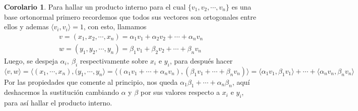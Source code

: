 \documentclass[10pt]{article}
\theoremstyle{definition}
\newtheorem{corollary}{Corolario}[theorem]
\begin{document}
\begin{corollary}
    Para hallar un producto interno para el cual $\{v_1,v_2,\cdots,v_n\}$ es una base ortonormal primero recordemos que todos sus vectores son ortogonales entre ellos y ademas $\langle v_i,v_i\rangle=1$, con esto, llamamos
    $$\begin{matrix}
v=( x_{1} ,x_{2} ,\cdots ,x_{n}) =\alpha _{1} v_{1} +\alpha _{2} v_{2} +\cdots +\alpha _{n} v_{n}\\
w=( y_{1} ,y_{2} ,\cdots ,y_{n}) =\beta _{1} v_{1} +\beta _{2} v_{2} +\cdots +\beta _{n} v_{n}
\end{matrix}$$
Luego, se despeja $\alpha_i,\ \beta_i$ respectivamente sobre $x_i$ e $y_i$, para después hacer $$\langle v,w\rangle=\langle (x_1,\cdots,x_n),(y_1,\cdots,y_n\rangle=\langle(\alpha_1v_1+\cdots+\alpha_nv_n),(\beta_1v_1+\cdots+\beta_nv_n)\rangle=\langle\alpha_1v_1,\beta_1v_1\rangle+\cdots+\langle\alpha_nv_n,\beta_nv_n\rangle$$
Por las propiedades que comente al principio, nos queda $\alpha_1\beta_1+\cdots+\alpha_n\beta_n$, aquí deshacemos la sustitución cambiando $\alpha$ y $\beta$ por sus valores respecto a $x_i$ e $y_i$, para así hallar el producto interno.
\end{corollary}
\end{document}
